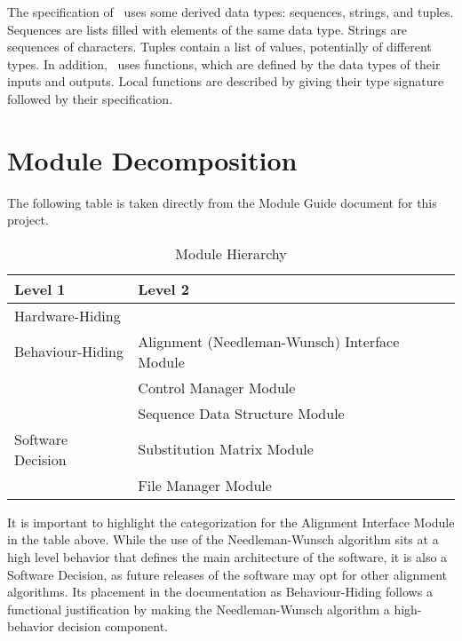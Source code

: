 \documentclass[12pt, titlepage]{article}
\begin{document}
\noindent
The specification of \progname \ uses some derived data types: sequences, strings, and
tuples. Sequences are lists filled with elements of the same data type. Strings
are sequences of characters. Tuples contain a list of values, potentially of
different types. In addition, \progname \ uses functions, which
are defined by the data types of their inputs and outputs. Local functions are
described by giving their type signature followed by their specification.

\section{Module Decomposition}

The following table is taken directly from the Module Guide document for this project.

\begin{table}[h!]
    \centering
    \begin{tabular}{p{} p{}}
    \toprule
    \textbf{Level 1} & \textbf{Level 2}\\
    \midrule
    
    Hardware-Hiding & ~ \\
    \midrule
    
    Behaviour-Hiding & Alignment (Needleman-Wunsch) Interface Module\\
    & Control Manager Module\\
    & Sequence Data Structure Module\\
    \midrule
    
    Software Decision & Substitution Matrix Module\\
    & File Manager Module\\
    \bottomrule
    
    \end{tabular}
    \caption{Module Hierarchy}
    \label{TblMH}
\end{table}


\newpage
It is important to highlight the categorization for the Alignment Interface Module in the table above. 
While the use of the Needleman-Wunsch algorithm sits at a high level behavior that defines 
the main architecture of the software, it is also a Software Decision, as future releases of the 
software may opt for other alignment algorithms. Its placement in the documentation as Behaviour-Hiding follows
a functional justification by making the Needleman-Wunsch algorithm a high-behavior decision component.
~\newpage
\end{document}
